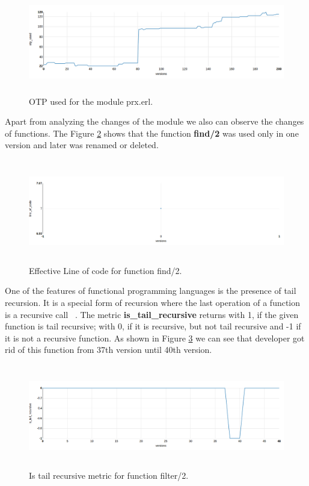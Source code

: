 \begin{figure}[h]
	\centering
	\includegraphics[height=45mm]{figures/otp_prx.png}
	\caption{OTP used for the module prx.erl.}
	\label{fig:otp_prx}
\end{figure}

Apart from analyzing the changes of the module we also can observe the changes of functions. The Figure \ref{fig:find/2} shows that the function \textbf{find/2} was used only in one version and later was renamed or deleted.

\begin{figure}[h]
	\centering
	\includegraphics[height=45mm]{figures/find2.png}
	\caption{Effective Line of code for function find/2.}
	\label{fig:find/2}
\end{figure}

One of the features of functional programming languages is the presence of tail recursion. It is a special form of recursion where the last operation of a function is a recursive call ~\cite{tail}.
The metric \textbf{is\_tail\_recursive} returns with 1, if the given function is tail recursive; with 0, if it is recursive, but not tail recursive and -1 if it is not a recursive function. As shown in Figure \ref{fig:tail1} we can see that developer got rid of this function from 37th version until 40th version.

\begin{figure}[h]
	\centering
	\includegraphics[height=45mm]{figures/filter2.png}
	\caption{Is tail recursive metric for function filter/2.}
	\label{fig:tail1}
\end{figure}

